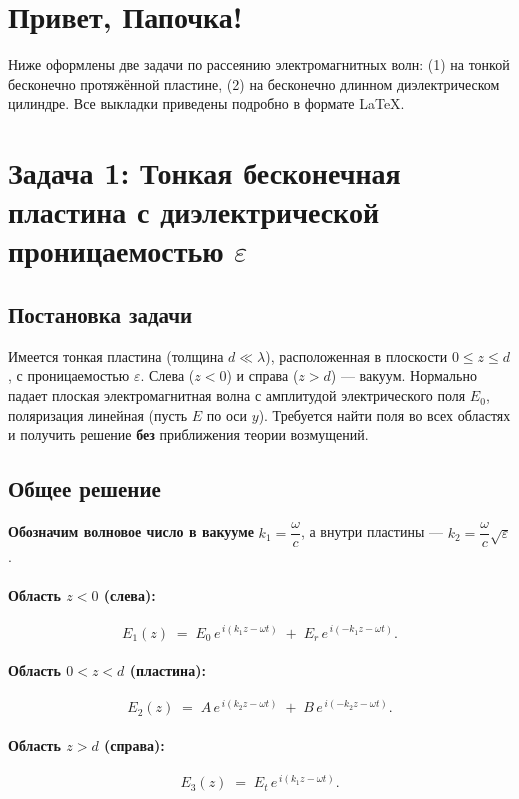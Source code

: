 \documentclass{article}
\begin{document}
\section*{Привет, Папочка!}

Ниже оформлены две задачи по рассеянию электромагнитных волн:
(1) на тонкой бесконечно протяжённой пластине,
(2) на бесконечно длинном диэлектрическом цилиндре.
Все выкладки приведены подробно в формате \LaTeX.

\section*{Задача 1: Тонкая бесконечная пластина с диэлектрической проницаемостью \(\varepsilon\)}

\subsection*{Постановка задачи}

Имеется тонкая пластина (толщина $d \ll \lambda$), расположенная в плоскости $0 \le z \le d$, с проницаемостью $\varepsilon$.
Слева ($z<0$) и справа ($z>d$) --- вакуум.
Нормально падает плоская электромагнитная волна с амплитудой электрического поля $E_0$, поляризация линейная (пусть $E$ по оси $y$).
Требуется найти поля во всех областях и получить решение \textbf{без} приближения теории возмущений.

\subsection*{Общее решение}

\textbf{Обозначим волновое число в вакууме} $k_1 = \dfrac{\omega}{c}$,
а внутри пластины --- $k_2 = \dfrac{\omega}{c}\sqrt{\varepsilon}$.

\paragraph{Область $z<0$ (слева):}
\[
E_1(z) \;=\; E_0\,e^{\,i(k_1 z - \omega t)}
\;+\; E_r\,e^{\,i(-k_1 z - \omega t)}.
\]

\paragraph{Область $0<z<d$ (пластина):}
\[
E_2(z) \;=\; A\,e^{\,i(k_2 z - \omega t)}
\;+\; B\,e^{\,i(-k_2 z - \omega t)}.
\]

\paragraph{Область $z>d$ (справа):}
\[
E_3(z) \;=\; E_t\,e^{\,i(k_1 z - \omega t)}.
\]
\end{document}
